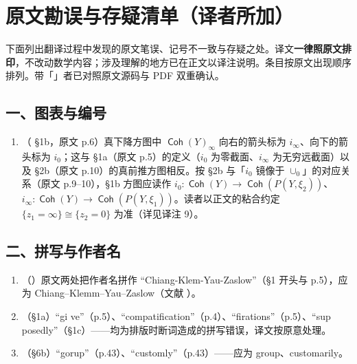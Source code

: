 \documentclass[11pt,a4paper]{article}
\DeclareMathOperator{\Coh}{\mathsf{Coh}}
\theoremstyle{cnth}
\begin{document}
\clearpage
\section{原文勘误与存疑清单（译者所加）}
\label{sec:errata}

下面列出翻译过程中发现的原文笔误、记号不一致与存疑之处。译文\textbf{一律照原文排印}，不改动数学内容；涉及理解的地方已在正文以译注说明。条目按原文出现顺序排列。带「\checkmark{}」者已对照原文源码与 PDF 双重确认。

\subsection*{一、图表与编号}
\begin{enumerate}[leftmargin=1.6em,itemsep=2pt]
\item （\checkmark{} §1b，原文 p.6）真下降方图中 $\Coh(Y)_{\infty}$ 向右的箭头标为 $i_{\infty}$、向下的箭头标为 $i_0$；这与 §1a（原文 p.5）的定义（$i_0$ 为零截面、$i_{\infty}$ 为无穷远截面）以及 §2b（原文 p.10）的真前推方图相反。按 §2b 与「$i_0$ 镜像于 $\cup_0$」的对应关系（原文 p.9--10），§1b 方图应读作 $i_0\colon\Coh(Y)\to\Coh(P(Y,\xi_2))$、$i_{\infty}\colon\Coh(Y)\to\Coh(P(Y,\xi_1))$。读者以正文的粘合约定 $\{z_1=\infty\}\cong\{z_2=0\}$ 为准（详见译注 9）。
\end{enumerate}

\subsection*{二、拼写与作者名}
\begin{enumerate}[leftmargin=1.6em,itemsep=2pt,resume]
\item （\checkmark{}）原文两处把作者名拼作 ``Chiang-Klem-Yau-Zaslow''（§1 开头与 p.5），应为 Chiang--Klemm--Yau--Zaslow（文献 \cite{CKYZ99}）。
\item （\checkmark{}§1a）``gi ve''（p.5）、``compatification''（p.4）、``firations''（p.5）、``sup posedly''（§1c）——均为排版时断词造成的拼写错误，译文按原意处理。
\item （\checkmark{}§6b）``gorup''（p.43）、``customly''（p.43）——应为 group、customarily。
\end{enumerate}
\end{document}
